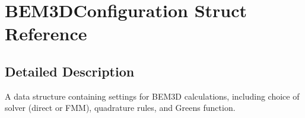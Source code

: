 \section{B\+E\+M3\+D\+Configuration Struct Reference}
\label{structBEM3DConfiguration}


\subsection{Detailed Description}
A data structure containing settings for B\+E\+M3\+D calculations, including choice of solver (direct or F\+M\+M), quadrature rules, and Green\textquotesingle{}s function. 